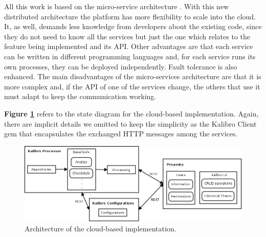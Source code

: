 All this work is based on the micro-service architecture \cite{namiot2014micro}. With this new distributed architecture the platform has more flexibility to scale into the cloud. It, as well, demands less knowledge from developers about the existing code, since they do not need to know all the services but just the one which relates to the feature being implemented and its API. Other advantages are that each service can be written in different programming languages and, for each service runs its own processes, they can be deployed independently. Fault tolerance is also enhanced. The main disadvantages of the micro-services architecture are that it is more complex and, if the API of one of the services change, the others that use it must adapt to keep the communication working.

\textbf{Figure \ref{fig:mezuro-cloud-arch}} refers to the state diagram for the cloud-based implementation. Again, there are implicit details we omitted to keep the simplicity as the Kalibro Client gem that encapsulates the exchanged HTTP messages among the services.

\begin{figure}[htb]
  \centering
  \includegraphics[width=\textwidth]{images/mezuro-cloud-arch.png}
  \caption{Architecture of the cloud-based implementation.}
  \label{fig:mezuro-cloud-arch}
\end{figure}